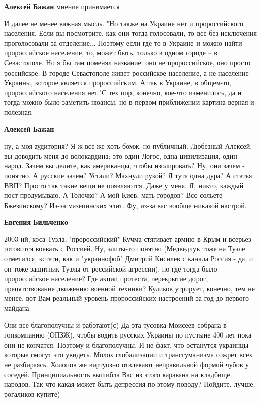 \begin{itemize}
\begin{itemize} %
\textbf{Алексей Бажан} мнение принимается
\end{itemize} %


И далее не менее важная мысль. "Но также на Украине нет и пророссийского
населения. Если вы посмотрите, как они тогда голосовали, то все без исключения
проголосовали за отделение... Поэтому если где-то в Украине и можно найти
пророссийское население, то, может быть, только в одном городе – в Севастополе.
Но я бы там поменял название: оно не пророссийское, оно просто российское. В
городе Севастополе живет российское население, а не население Украины, которое
является пророссийским. А так в Украине, в общем-то, пророссийского населения
нет."С тех пор, конечно, кое-что изменилось, да и тогда можно было заметить
нюансы, но в первом приближении картина верная и полезная.

\begin{itemize} %
\textbf{Алексей Бажан} 

ну, а моя аудитория? Я ж все же хоть бомж, но публичный. Любезный Алексей, вы
доводить меня до волокардина: это один Логос, одна цивилизация, один народ.
Зачем вы делите, как американцы, чтобы изолировать? Ну, они зачем - понятно. А
русские зачем? Устали? Махнули рукой? Я тута одна дура? А статья ВВП? Просто
так такие вещи не появляются. Даже у меня. Я, никто, каждый пост продумываю. А
Толочко? А мой Киев, мать городов? Все сольете Бжезинскому? Из-за мазепинских
элит. Фу, из-за вас вообще никакой настрой.

\textbf{Евгения Бильченко} 

2003-ий, коса Тузла, "пророссийский" Кучма стягивает армию в Крым и всерьез
готовится воевать с Россией. Ну, элиты-то понятно (Медведчук тоже на Тузле
отметился, кстати, как и "украинофоб" Дмитрий Кисилев с канала Россия - да, и
он тоже защитник Тузлы от российской агрессии), но где тогда было пророссийское
население? Где акции протеста, перекрытие дорог, препятствование движению
военной техники? Куликов утрирует, конечно, тем не менее, вот Вам реальный
уровень пророссийских настроений за год до первого майдана.

\end{itemize} %


Они все благополучны и работают(с) Да эта тусовка Моисеев собрана в гопкомпанию
(ОПЗЖ), чтобы водить русских Украины по пустыне 400 лет пока они не кончатся.
Поэтому и благополучны. И не факт, что останутся украинцы которые смогут это
увидеть. Молох глобализации и трансгуманизма сожрет всех не разбираясь. Холопов
же виртуозно отвлекают неправильной формой чубов у соседей. Принципиальность
вышибла Вас из этого каравана на кладбище народов. Так что какая может быть
депрессия по этому поводу? Пойдите, лучше, рогаликов купите)


\end{itemize}
